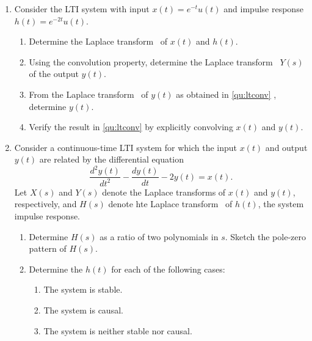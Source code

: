 \documentclass[11pt]{article}
\newcommand\lt{Laplace transform}
\begin{document}
\begin{enumerate}
           \item Consider the LTI system with input $x(t) = e^{-t}u(t)$  and impulse response $h(t) = e^{-2t}u(t)$.
           \begin{enumerate}
           	\item Determine the \lt~ of $x(t)$ and $h(t)$.
           	\item \label{qu:ltconv} Using the convolution property, determine the \lt~ $Y(s)$ of the output $y(t)$.
           	\item From the \lt~ of $y(t)$ as obtained in \ref{qu:ltconv} , determine $y(t)$.
           	\item Verify the result in \ref{qu:ltconv} by explicitly convolving $x(t)$ and $y(t)$.
           \end{enumerate}
           
           \item Consider a continuous-time LTI system for which the input $x(t)$ and output $y(t)$ are related by the differential equation
           \begin{equation}
                \frac{d^2 y(t)}{d t^2} - \frac{d y(t)}{d t} -2y(t) = x(t).           	
           \end{equation}
           Let $X(s)$ and $Y(s)$ denote the \lt s of  $x(t)$ and $y(t)$, respectively, and $H(s)$ denote hte \lt~ of $h(t)$, the system impulse response.
           \begin{enumerate}
       			\item Determine $H(s)$ as a ratio of two polynomials in $s$. Sketch the pole-zero pattern of $H(s)$.
       			\item Determine the $h(t)$ for each of the following cases:
       			\begin{enumerate}
       				\item The system is stable.
       				\item The system is causal.
       				\item The system is neither stable nor causal.
       			\end{enumerate}
       			
           \end{enumerate}
           

\end{enumerate}
\end{document}
